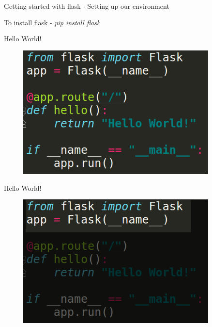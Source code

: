 \documentclass{beamer}
\begin{document}
\begin{frame}{Getting started with flask - Setting up our environment}

To install flask - \textit{pip install flask}

\end{frame}

\begin{frame}{Hello World!}

\begin{figure}[h]
\includegraphics[width=0.9\textwidth]{flask}
\end{figure}

\end{frame}
\begin{frame}{Hello World!}

\begin{figure}[h]
\includegraphics[width=0.9\textwidth]{flask1}
\end{figure}

\end{frame}
\end{document}
